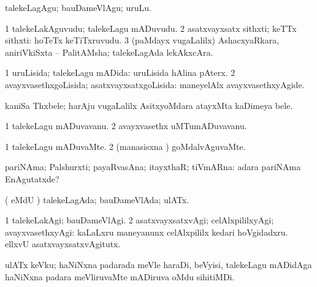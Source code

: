 {{\noindent
\gl{\akirx}
\expl{}
\bmng
talekeLagAgu; bauDameVlAgu; uruLu. 
\emng
\eentry

\bentry
{}
\gl{\nA}
\expl{}
\bmng
\bnum
\num{1} talekeLakAguvudu; talekeLagu mADuvudu. 
\num{2} asatxvayxsatx sithxti; keTTx sithxti:  hoTeTx keTiTxruvudu. 
\num{3} (paMdayx \mo vugaLalilx) AshacxyaRkara, aniriVkiSxta -- PalitAMsha; talekeLagAda lekAkxcAra. 
\enum
\emng
\eentry

\bentry
{} 
\gl{\gu}
\expl{}
\bmng
\bnum
\num{1} uruLisida; talekeLagu mADida:  uruLisida hAlina pAterx. 
\num{2} avayxvasethxgoLisida; asatxvayxsatxgoLisida:  maneyelAlx avayxvasethxyAgide. 
\enum
\emng
\eentry

\bentry
{}
\gl{\nA}
\expl{}
\bmng
kaniSa Thxbele; harAju \mo vugaLalilx AsitxyoMdara atayxMta kaDimeya bele. 
\emng
\eentry

\bentry
{} 
\gl{\nA}
\bmng
\bnum
\num{1} talekeLagu mADuvavanu. 
\num{2} avayxvasethx uMTumADuvavanu. 
\enum
\emng
\eentry

\bentry
{} 
\gl{\kirxvi}
\expl{}
\bmng
\bnum
\num{1} talekeLagu mADuvaMte. 
\num{2} (manasisxna \vi) goMdalvAguvaMte. 
\enum
\emng
\eentry

\bentry
{} 
\gl{\nA}
\expl{}
\bmng
pariNAma; Palshurxti; payaRvasAna; itayxthaR; tiVmARna:  adara pariNAma EnAgutatxde? 
\emng
\eentry

\bentry
{} 
\gl{\gu}
\expl{}
\bmng
( eMdU \parx) talekeLagAda; bauDameVlAda; ulATx. 
\emng
\eentry

\bentry
{} 
\gl{\kirxvi}
\expl{}
\bmng
\bnum
\num{1} talekeLakAgi; bauDameVlAgi. 
\num{2} asatxvayxsatxvAgi; celAlxpililxyAgi; avayxvasethxyAgi:  kaLaLxru maneyanunx celAlxpililx kedari hoVgidadxru.  ellxvU asatxvayxsatxvAgitutx. 
\enum
\emng
\eentry

\bentry
{}
\gl{\nA}
\expl{}
\bmng
ulATx keVku; haNiNxna padarada meVle haraDi, beVyisi, talekeLagu mADidAga haNiNxna padara meVliruvaMte mADiruva oMdu sihitiMDi. 
\emng
\eentry

}}
